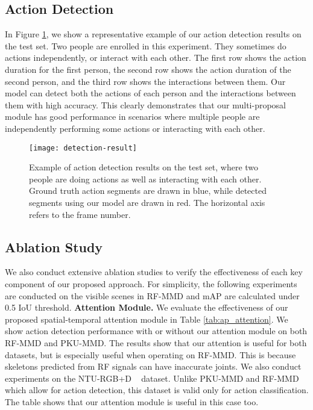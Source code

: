 \documentclass[10pt,twocolumn,letterpaper]{article}
\begin{document}
\subsection{Action Detection}

In Figure \ref{fig:detection-result}, we show a representative example of our action detection results on the test set. Two people are enrolled in this experiment. They sometimes do actions independently, or interact with each other. The first row shows the action duration for the first person, the second row shows the action duration of the second person, and the third row shows the interactions between them. Our model can detect both the actions of each person and the interactions between them with high accuracy. This clearly demonstrates that our multi-proposal module has good performance in scenarios where multiple people are independently performing some actions or interacting with each other. 

\begin{figure}[htbp]
\centering
\texttt{[image: detection-result]}
  \vspace{-10pt}
\caption{\footnotesize{Example of action detection results on the test set, where two people are doing actions as well as interacting with each other. Ground truth action segments are drawn in blue, while detected segments using our model are drawn in red. The horizontal axis refers to the frame number.}}    \label{fig:detection-result}
  \vspace{-10pt}
\end{figure}








\subsection{Ablation Study}
We also conduct extensive ablation studies to verify the effectiveness of each key component of our proposed approach. For simplicity, the following experiments are conducted on the visible scenes in RF-MMD and mAP are calculated under 0.5 IoU threshold.
\vskip  0.06in \noindent
\textbf{Attention Module. }
We evaluate the effectiveness of our proposed spatial-temporal attention module in Table \ref{tab:ap_attention}. We show action detection performance with or without our attention module on both RF-MMD and PKU-MMD. The results show that our attention is useful for both datasets, but is especially useful when operating on RF-MMD. This is because skeletons predicted from RF signals can have inaccurate joints. We also conduct experiments on the NTU-RGB+D ~\cite{shahroudy2016ntu} dataset. Unlike PKU-MMD and RF-MMD which allow for action detection, this dataset is valid only for action classification. 
The table shows that our attention module is useful in this case too. 
\end{document}
